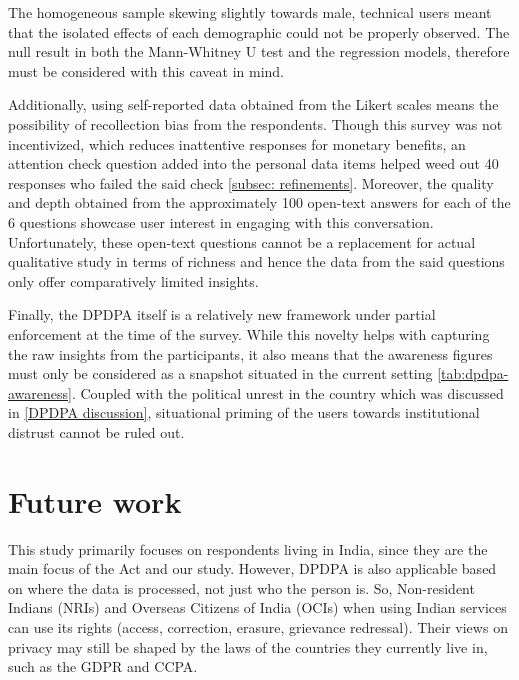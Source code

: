 The homogeneous sample skewing slightly towards male, technical users meant that the isolated effects of each demographic could not be properly observed. The null result in both the Mann-Whitney U test and the regression models, therefore must be considered with this caveat in mind.

Additionally, using self-reported data obtained from the Likert scales means the possibility of recollection bias from the respondents. Though this survey was not incentivized, which reduces inattentive responses for monetary benefits, an attention check question added into the personal data items helped weed out 40 responses who failed the said check \ref{subsec: refinements}. Moreover, the quality and depth obtained from the approximately 100 open-text answers for each of the 6 questions showcase user interest in engaging with this conversation. Unfortunately, these open-text questions cannot be a replacement for actual qualitative study in terms of richness and hence the data from the said questions only offer comparatively limited insights.

Finally, the DPDPA itself is a relatively new framework under partial enforcement at the time of the survey. While this novelty helps with capturing the raw insights from the participants, it also means that the awareness figures must only be considered as a snapshot situated in the current setting \ref{tab:dpdpa-awareness}. Coupled with the political unrest in the country which was discussed in \ref{DPDPA discussion}, situational priming of the users towards institutional distrust cannot be ruled out.


\section{Future work} \label{sec: future work} 

This study primarily focuses on respondents living in India, since they are the main focus of the Act and our study. However, DPDPA is also applicable based on where the data is processed, not just who the person is. So, Non-resident Indians (NRIs) and Overseas Citizens of India (OCIs) when using Indian services can use its rights (access, correction, erasure, grievance redressal). Their views on privacy may still be shaped by the laws of the countries they currently live in, such as the GDPR and CCPA. 

